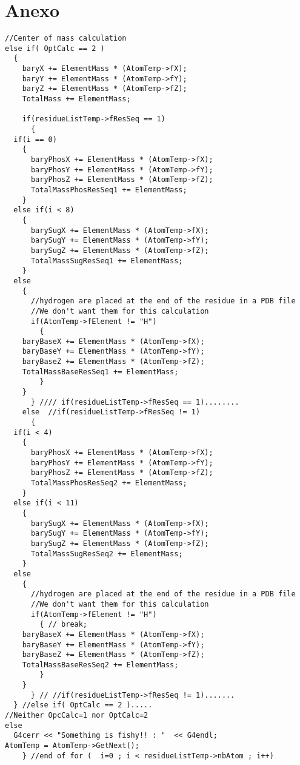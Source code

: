\clearpage
\section{Anexo}
\label{app:CM}
\lstset {language=C++}
\begin{lstlisting}
//Center of mass calculation
else if( OptCalc == 2 )
  {
    baryX += ElementMass * (AtomTemp->fX);
    baryY += ElementMass * (AtomTemp->fY);
    baryZ += ElementMass * (AtomTemp->fZ);
    TotalMass += ElementMass;

    if(residueListTemp->fResSeq == 1)
      {
  if(i == 0)
    {
      baryPhosX += ElementMass * (AtomTemp->fX);
      baryPhosY += ElementMass * (AtomTemp->fY);
      baryPhosZ += ElementMass * (AtomTemp->fZ);
      TotalMassPhosResSeq1 += ElementMass;
    }
  else if(i < 8)
    {
      barySugX += ElementMass * (AtomTemp->fX);
      barySugY += ElementMass * (AtomTemp->fY);
      barySugZ += ElementMass * (AtomTemp->fZ);
      TotalMassSugResSeq1 += ElementMass;
    }
  else
    {
      //hydrogen are placed at the end of the residue in a PDB file
      //We don't want them for this calculation
      if(AtomTemp->fElement != "H")
        {
    baryBaseX += ElementMass * (AtomTemp->fX);
    baryBaseY += ElementMass * (AtomTemp->fY);
    baryBaseZ += ElementMass * (AtomTemp->fZ);
    TotalMassBaseResSeq1 += ElementMass;
        }
    }
      } //// if(residueListTemp->fResSeq == 1)........
    else  //if(residueListTemp->fResSeq != 1)
      {
  if(i < 4)
    {
      baryPhosX += ElementMass * (AtomTemp->fX);
      baryPhosY += ElementMass * (AtomTemp->fY);
      baryPhosZ += ElementMass * (AtomTemp->fZ);
      TotalMassPhosResSeq2 += ElementMass;
    }
  else if(i < 11)
    {
      barySugX += ElementMass * (AtomTemp->fX);
      barySugY += ElementMass * (AtomTemp->fY);
      barySugZ += ElementMass * (AtomTemp->fZ);
      TotalMassSugResSeq2 += ElementMass;
    }
  else
    {
      //hydrogen are placed at the end of the residue in a PDB file
      //We don't want them for this calculation
      if(AtomTemp->fElement != "H")
        { // break;
    baryBaseX += ElementMass * (AtomTemp->fX);
    baryBaseY += ElementMass * (AtomTemp->fY);
    baryBaseZ += ElementMass * (AtomTemp->fZ);
    TotalMassBaseResSeq2 += ElementMass;
        }
    }
      } // //if(residueListTemp->fResSeq != 1).......
  } //else if( OptCalc == 2 ).....
//Neither OpcCalc=1 nor OptCalc=2
else
  G4cerr << "Something is fishy!! : "  << G4endl;
AtomTemp = AtomTemp->GetNext();
    } //end of for (  i=0 ; i < residueListTemp->nbAtom ; i++)
\end{lstlisting}
